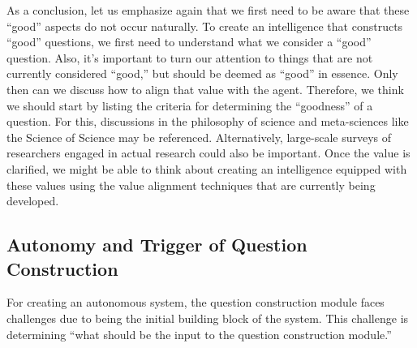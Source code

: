\documentclass{book}
\begin{document}
As a conclusion, let us emphasize again that we first need to be aware that these ``good'' aspects do not occur naturally. To create an intelligence that constructs ``good'' questions, we first need to understand what we consider a ``good'' question. Also, it's important to turn our attention to things that are not currently considered ``good,'' but should be deemed as ``good'' in essence. Only then can we discuss how to align that value with the agent. Therefore, we think we should start by listing the criteria for determining the ``goodness'' of a question. For this, discussions in the philosophy of science and meta-sciences like the Science of Science may be referenced. Alternatively, large-scale surveys of researchers engaged in actual research could also be important. Once the value is clarified, we might be able to think about creating an intelligence equipped with these values using the value alignment techniques that are currently being developed.



\subsection{Autonomy and Trigger of Question Construction}
For creating an autonomous system, the question construction module faces challenges due to being the initial building block of the system. This challenge is determining ``what should be the input to the question construction module.''
\end{document}
